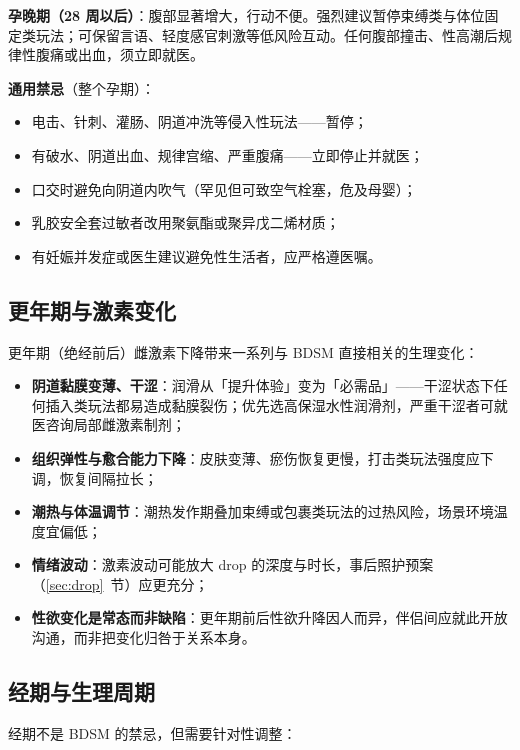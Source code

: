 \documentclass[12pt,UTF8]{ctexbook}
\begin{document}
\textbf{孕晚期（28 周以后）}：腹部显著增大，行动不便。强烈建议暂停束缚类与体位固定类玩法；可保留言语、轻度感官刺激等低风险互动。任何腹部撞击、性高潮后规律性腹痛或出血，须立即就医。

\textbf{通用禁忌}（整个孕期）：
\begin{itemize}
\item 电击、针刺、灌肠、阴道冲洗等侵入性玩法——暂停；
\item 有破水、阴道出血、规律宫缩、严重腹痛——立即停止并就医；
\item 口交时避免向阴道内吹气（罕见但可致空气栓塞，危及母婴）；
\item 乳胶安全套过敏者改用聚氨酯或聚异戊二烯材质；
\item 有妊娠并发症或医生建议避免性生活者，应严格遵医嘱。
\end{itemize}

\subsection{更年期与激素变化}

更年期（绝经前后）雌激素下降带来一系列与 BDSM 直接相关的生理变化：

\begin{itemize}
\item \textbf{阴道黏膜变薄、干涩}：润滑从「提升体验」变为「必需品」——干涩状态下任何插入类玩法都易造成黏膜裂伤；优先选高保湿水性润滑剂，严重干涩者可就医咨询局部雌激素制剂；
\item \textbf{组织弹性与愈合能力下降}：皮肤变薄、瘀伤恢复更慢，打击类玩法强度应下调，恢复间隔拉长；
\item \textbf{潮热与体温调节}：潮热发作期叠加束缚或包裹类玩法的过热风险，场景环境温度宜偏低；
\item \textbf{情绪波动}：激素波动可能放大 drop 的深度与时长，事后照护预案（\ref{sec:drop}~节）应更充分；
\item \textbf{性欲变化是常态而非缺陷}：更年期前后性欲升降因人而异，伴侣间应就此开放沟通，而非把变化归咎于关系本身。
\end{itemize}

\subsection{经期与生理周期}

经期不是 BDSM 的禁忌，但需要针对性调整：
\end{document}
